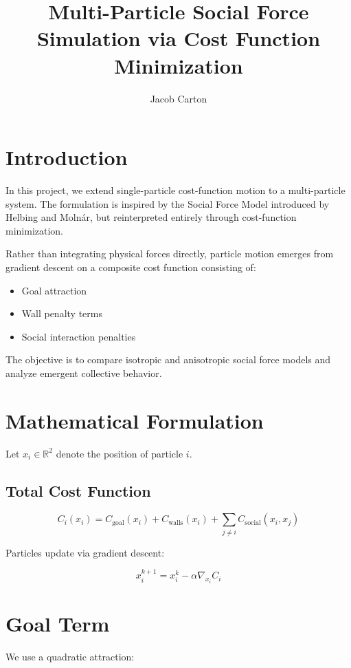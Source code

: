 \documentclass[11pt]{article}
\title{Multi-Particle Social Force Simulation via Cost Function Minimization}
\author{Jacob Carton}
\date{}
\begin{document}
\maketitle

\section{Introduction}

In this project, we extend single-particle cost-function motion to a multi-particle system.
The formulation is inspired by the Social Force Model introduced by Helbing and Moln\'ar,
but reinterpreted entirely through cost-function minimization.

Rather than integrating physical forces directly, particle motion emerges from gradient
descent on a composite cost function consisting of:

\begin{itemize}
\item Goal attraction
\item Wall penalty terms
\item Social interaction penalties
\end{itemize}

The objective is to compare isotropic and anisotropic social force models and analyze
emergent collective behavior.

\section{Mathematical Formulation}

Let $x_i \in \mathbb{R}^2$ denote the position of particle $i$.

\subsection{Total Cost Function}

\[
C_i(x_i) =
C_{\text{goal}}(x_i)
+
C_{\text{walls}}(x_i)
+
\sum_{j \ne i} C_{\text{social}}(x_i, x_j)
\]

Particles update via gradient descent:

\[
x_i^{k+1} =
x_i^{k} - \alpha \nabla_{x_i} C_i
\]

\section{Goal Term}

We use a quadratic attraction:
\end{document}
